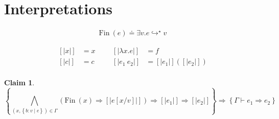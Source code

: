 \documentclass[10pt,a4paper]{article}
\newtheorem{claim}{Claim}
\newcommand\efun[2]{\ensuremath{\lambda #1 . #2}}
\newcommand\eapp[2]{\ensuremath{#1 \ #2}}
\newcommand\tref[3]{\ensuremath{\left\lbrace #1 \colon #2 \mid #3 \right\rbrace}}
\newcommand\fin[1]{\ensuremath{\text{Fin}\ (#1)}}
\newcommand\sub[2]{\ensuremath{\left[ #2 / #1 \right]}}
\newcommand\interp[1]{\ensuremath{[|#1|]}}
\newcommand\evals[2]{\ensuremath{#1 \hookrightarrow^\star #2}}
\newcommand\issubref[3]{\ensuremath{#1 \vdash #2 \Rightarrow #3}}
\begin{document}
\section*{Interpretations}
\begin{align*}
\fin{e} \doteq \exists v. \evals{e}{v}
\end{align*}

\begin{align*}
\interp{x}&=x &&&
\interp{\efun{x}{e}}&=f\\
\interp{c}&=c &&&
\interp{\eapp{e_1}{e_2}}&=\interp{e_1}(\interp{e_2})\\
\end{align*}

\begin{claim}
$$
\left\lbrace	
	\bigwedge_{(x,\tref{b}{v}{e})\in\Gamma}(\fin{x}\Rightarrow \interp{e\sub{v}{x}})
	\Rightarrow \interp{e_1}
	\Rightarrow \interp{e_2}
\right\rbrace
\Rightarrow
\left\lbrace	
\issubref{\Gamma}{e_1}{e_2}
\right\rbrace
$$
\end{claim}
\end{document}

